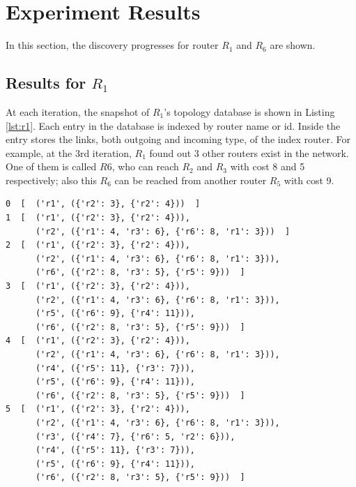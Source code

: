 \documentclass[12pt]{article}  %
\theoremstyle{definition}
\theoremstyle{remark}
\begin{document}
\section{Experiment Results}
In this section, the discovery progresses for router $R_1$ and $R_6$ are shown.

\subsection{Results for $R_1$}
At each iteration, the snapshot of $R_1$'s topology database is shown in Listing \ref{lst:r1}.
Each entry in the database is indexed by router name or id.
Inside the entry stores the links, both outgoing and incoming type, of the index router.
For example, at the 3rd iteration, $R_1$ found out 3 other routers exist in the network.
One of them is called $R6$, who can reach $R_2$ and $R_3$ with cost 8 and 5 respectively;
also this $R_6$ can be reached from another router $R_5$ with cost 9.

\begin{lstlisting}
0  [  ('r1', ({'r2': 3}, {'r2': 4}))  ]
1  [  ('r1', ({'r2': 3}, {'r2': 4})),
      ('r2', ({'r1': 4, 'r3': 6}, {'r6': 8, 'r1': 3}))  ]
2  [  ('r1', ({'r2': 3}, {'r2': 4})),
      ('r2', ({'r1': 4, 'r3': 6}, {'r6': 8, 'r1': 3})),
      ('r6', ({'r2': 8, 'r3': 5}, {'r5': 9}))  ]
3  [  ('r1', ({'r2': 3}, {'r2': 4})),
      ('r2', ({'r1': 4, 'r3': 6}, {'r6': 8, 'r1': 3})),
      ('r5', ({'r6': 9}, {'r4': 11})),
      ('r6', ({'r2': 8, 'r3': 5}, {'r5': 9}))  ]
4  [  ('r1', ({'r2': 3}, {'r2': 4})),
      ('r2', ({'r1': 4, 'r3': 6}, {'r6': 8, 'r1': 3})),
      ('r4', ({'r5': 11}, {'r3': 7})),
      ('r5', ({'r6': 9}, {'r4': 11})),
      ('r6', ({'r2': 8, 'r3': 5}, {'r5': 9}))  ]
5  [  ('r1', ({'r2': 3}, {'r2': 4})),
      ('r2', ({'r1': 4, 'r3': 6}, {'r6': 8, 'r1': 3})),
      ('r3', ({'r4': 7}, {'r6': 5, 'r2': 6})),
      ('r4', ({'r5': 11}, {'r3': 7})),
      ('r5', ({'r6': 9}, {'r4': 11})),
      ('r6', ({'r2': 8, 'r3': 5}, {'r5': 9}))  ]
\end{lstlisting}
\end{document}
